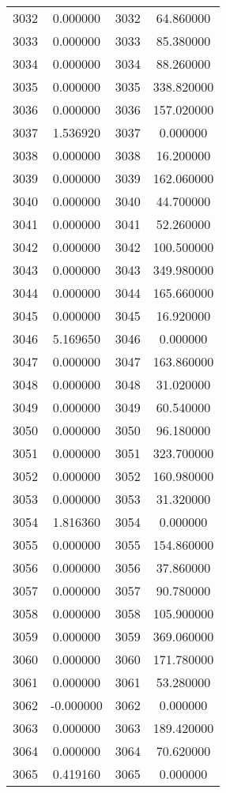 \documentclass[12pt]{article}
\begin{document}
\begin{longtable}{@{}cccc@{}}
3032 & 0.000000 & 3032 & 64.860000 \\
3033 & 0.000000 & 3033 & 85.380000 \\
3034 & 0.000000 & 3034 & 88.260000 \\
3035 & 0.000000 & 3035 & 338.820000 \\
3036 & 0.000000 & 3036 & 157.020000 \\
3037 & 1.536920 & 3037 & 0.000000 \\
3038 & 0.000000 & 3038 & 16.200000 \\
3039 & 0.000000 & 3039 & 162.060000 \\
3040 & 0.000000 & 3040 & 44.700000 \\
3041 & 0.000000 & 3041 & 52.260000 \\
3042 & 0.000000 & 3042 & 100.500000 \\
3043 & 0.000000 & 3043 & 349.980000 \\
3044 & 0.000000 & 3044 & 165.660000 \\
3045 & 0.000000 & 3045 & 16.920000 \\
3046 & 5.169650 & 3046 & 0.000000 \\
3047 & 0.000000 & 3047 & 163.860000 \\
3048 & 0.000000 & 3048 & 31.020000 \\
3049 & 0.000000 & 3049 & 60.540000 \\
3050 & 0.000000 & 3050 & 96.180000 \\
3051 & 0.000000 & 3051 & 323.700000 \\
3052 & 0.000000 & 3052 & 160.980000 \\
3053 & 0.000000 & 3053 & 31.320000 \\
3054 & 1.816360 & 3054 & 0.000000 \\
3055 & 0.000000 & 3055 & 154.860000 \\
3056 & 0.000000 & 3056 & 37.860000 \\
3057 & 0.000000 & 3057 & 90.780000 \\
3058 & 0.000000 & 3058 & 105.900000 \\
3059 & 0.000000 & 3059 & 369.060000 \\
3060 & 0.000000 & 3060 & 171.780000 \\
3061 & 0.000000 & 3061 & 53.280000 \\
3062 & -0.000000 & 3062 & 0.000000 \\
3063 & 0.000000 & 3063 & 189.420000 \\
3064 & 0.000000 & 3064 & 70.620000 \\
3065 & 0.419160 & 3065 & 0.000000 \\

\end{longtable}
\end{document}
